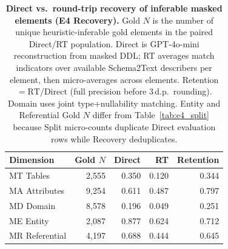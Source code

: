 \begin{table}[t]
\centering
\small
\caption{\textbf{Direct vs.\ round-trip recovery of inferable masked elements (E4 Recovery).}
Gold $N$ is the number of unique heuristic-inferable gold elements in the paired Direct/RT population. Direct is GPT-4o-mini reconstruction from masked DDL; RT averages match indicators over available Schema2Text describers per element, then micro-averages across elements. Retention $=\mathrm{RT}/\mathrm{Direct}$ (full precision before 3\,d.p.\ rounding). Domain uses joint type+nullability matching. Entity and Referential Gold $N$ differ from Table~\ref{tab:e4_split} because Split micro-counts duplicate Direct evaluation rows while Recovery deduplicates.}
\label{tab:e4_recovery}
\begin{tabular}{lrrrr}
\toprule
\textbf{Dimension} & \textbf{Gold $N$} & \textbf{Direct} & \textbf{RT} & \textbf{Retention} \\
\midrule
MT Tables      & 2{,}555 & 0.350 & 0.120 & 0.344 \\
MA Attributes  & 9{,}254 & 0.611 & 0.487 & 0.797 \\
MD Domain      & 8{,}578 & 0.196 & 0.049 & 0.251 \\
ME Entity      & 2{,}087 & 0.877 & 0.624 & 0.712 \\
MR Referential & 4{,}197 & 0.688 & 0.444 & 0.645 \\
\bottomrule
\end{tabular}
\end{table}
